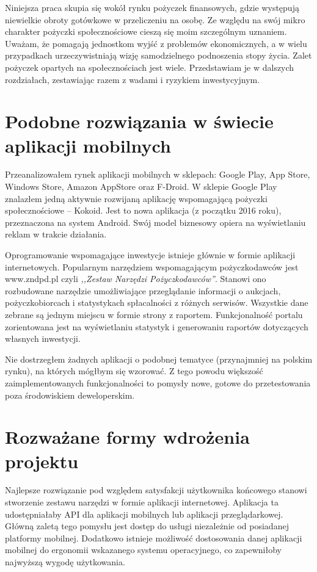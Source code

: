\documentclass[a4paper,twoside,titlepage,openright]{book}
\begin{document}
Niniejsza praca skupia się wokół rynku pożyczek finansowych, gdzie występują niewielkie obroty gotówkowe w przeliczeniu na osobę. Ze względu na swój mikro charakter pożyczki społecznościowe cieszą się moim szczególnym uznaniem. Uważam, że pomagają jednostkom wyjść z problemów ekonomicznych, a w wielu przypadkach urzeczywistniają wizję samodzielnego podnoszenia stopy życia. Zalet pożyczek opartych na społecznościach jest wiele. Przedstawiam je w dalszych rozdziałach, zestawiając razem z wadami i ryzykiem inwestycyjnym.

\section*{Podobne rozwiązania w świecie aplikacji mobilnych}

Przeanalizowałem rynek aplikacji mobilnych w sklepach: Google Play, App Store, Windows Store, Amazon AppStore oraz F-Droid. W sklepie Google Play znalazłem jedną aktywnie rozwijaną aplikację wspomagającą pożyczki społecznościowe -- Kokoid. Jest to nowa aplikacja (z początku 2016 roku), przeznaczona na system Android. Swój model biznesowy opiera na wyświetlaniu reklam w trakcie działania.

Oprogramowanie wspomagające inwestycje istnieje głównie w formie aplikacji internetowych. Popularnym narzędziem wspomagającym pożyczkodawców jest www.zndpd.pl czyli \textit{,,Zestaw Narzędzi Pożyczkodawców''}. Stanowi ono rozbudowane narzędzie umożliwiające przeglądanie informacji o aukcjach, pożyczkobiorcach i statystykach spłacalności z różnych serwisów. Wszystkie dane zebrane są jednym miejscu w formie strony z raportem. Funkcjonalność portalu zorientowana jest na wyświetlaniu statystyk i generowaniu raportów dotyczących własnych inwestycji.

Nie dostrzegłem żadnych aplikacji o podobnej tematyce (przynajmniej na polskim rynku), na których mógłbym się wzorować. Z tego powodu większość zaimplementowanych funkcjonalności to pomysły nowe, gotowe do przetestowania poza środowiskiem deweloperskim.

\section*{Rozważane formy wdrożenia projektu}

Najlepsze rozwiązanie pod względem satysfakcji użytkownika końcowego stanowi stworzenie zestawu narzędzi w formie aplikacji internetowej. Aplikacja ta udostępniałaby API dla aplikacji mobilnych lub aplikacji przeglądarkowej. Główną zaletą tego pomysłu jest dostęp do usługi niezależnie od posiadanej platformy mobilnej. Dodatkowo istnieje możliwość dostosowania danej aplikacji mobilnej do ergonomii wskazanego systemu operacyjnego, co zapewniłoby najwyższą wygodę użytkowania. 
\end{document}
